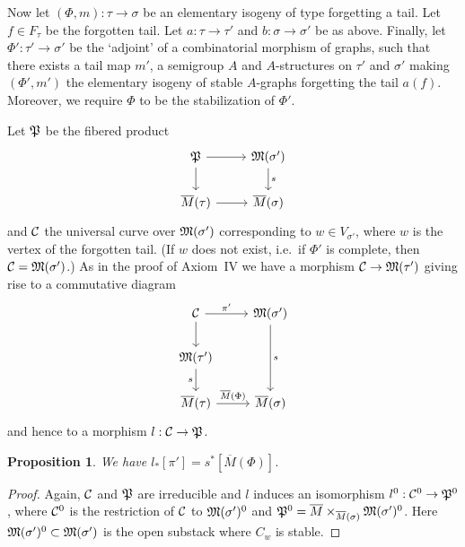 \documentclass{article}
\newtheorem{prop}{Proposition}
\newcommand{\upst}{^{\ast}}
\newcommand{\lst}{_{\ast}}
\newcommand{\PP}{{\frak P}}
\newcommand{\MM}{{\frak M}}
\newcommand{\cC}{{\cal C}}
\newcommand{\ol}{\overline}
\newcommand{\ldiag}[1]%
       {\makebox[0cm]{${\scriptstyle#1}\downarrow\phantom{\scriptstyle#1}$}}
\newcommand{\rdiag}[1]%
       {\makebox[0cm]{$\phantom{\scriptstyle#1}\downarrow{\scriptstyle#1}$}}
\newcommand{\comdia}[9]{%
\begin{array}{ccc}
#1 & \stackrel{#2}{\longrightarrow} & #3 \\
\ldiag{#4} & #5 & \rdiag{#6} \\
#7 & \stackrel{#8}{\longrightarrow} & #9
\end{array}}
\begin{document}
Now let $(\Phi,m):\tau\to \sigma$ be an elementary isogeny of type
forgetting a tail. Let $f\in F_{\tau}$ be the forgotten tail. Let
$a:\tau\to\tau'$ and $b:\sigma\to\sigma'$ be as above. Finally, let
$\Phi':\tau'\to\sigma'$ be the `adjoint' of a combinatorial morphism
of graphs, such that there exists a tail map $m'$, a semigroup $A$ and
$A$-structures on $\tau'$ and $\sigma'$ making $(\Phi',m')$ the
elementary isogeny of stable $A$-graphs forgetting the tail $a(f)$.
Moreover, we require $\Phi$ to be the stabilization of $\Phi'$.

Let $\PP$ be the fibered product
\[\begin{tikzcd}
  \PP \dar \rar
  & \MM(\sigma') \dar["s"] \\
  \ol{M}(\tau) \rar
  & \ol{M}(\sigma)
\end{tikzcd}\]
and $\cC$ the universal curve over $\MM(\sigma')$ corresponding to
$w\in V_{\sigma'}$, where $w$ is the vertex of the forgotten tail. (If
$w$ does not exist, i.e.\ if $\Phi'$ is complete, then
$\cC=\MM(\sigma')$.) As
in the proof of Axiom~IV we have a morphism $\cC\rightarrow\MM(\tau')$
giving rise to a commutative diagram
\[\begin{tikzcd}
  \cC \dar \rar["\pi'"] & \MM(\sigma') \arrow[dd,"s"] \\
  \MM(\tau') \dar["s"'] \\
  \ol{M}(\tau) \rar["\ol{M}(\Phi)"] & \ol{M}(\sigma)
\end{tikzcd}\]
and hence to a morphism $l:\cC\rightarrow\PP$.

\begin{prop} \label{evfat}
We have $l\lst[\pi']= s\upst [\ol{M}(\Phi)]$.
\end{prop}
\begin{proof}
Again, $\cC$ and $\PP$ are irreducible and $l$ induces an isomorphism
$l^0:\cC^0\to\PP^0$, where $\cC^0$ is the restriction of $\cC$ to
$\MM(\sigma')^0$ and
$\PP^0=\ol{M}\times_{\ol{M}(\sigma)}\MM(\sigma')^0$. Here
$\MM(\sigma')^0\subset\MM(\sigma')$ is the open substack where $C_w$
is stable.
\end{proof}
\end{document}
